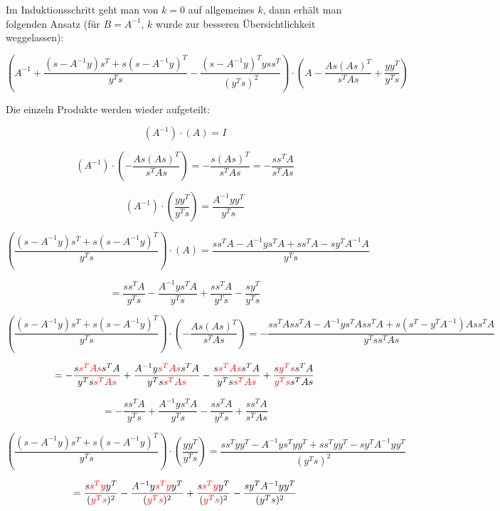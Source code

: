 \documentclass[a4paper, 12pt]{report}
\begin{document}
Im Induktionsschritt geht man von $k = 0$ auf allgemeines $k$, dann erhält man folgenden Ansatz (für $B = A^{-1}$, $k$ wurde zur besseren Übersichtlichkeit weggelassen):

$$\left(A^{-1} + \frac{(s - A^{-1}y)s^T + s(s - A^{-1}y)^T}{y^Ts} - \frac{(s - A^{-1}y)^Tyss^T}{(y^Ts)^2} \right) \cdot \left(A - \frac{As(As)^T}{s^TAs} + \frac{yy^T}{y^Ts} \right) $$

Die einzeln Produkte werden wieder aufgeteilt:

$$\left(A^{-1} \right)\cdot \left(A \right) = I$$

$$\left(A^{-1} \right)\cdot \left(- \frac{As(As)^T}{s^TAs} \right) = - \frac{s(As)^T}{s^TAs} = -\frac{ss^TA}{s^TAs}$$

$$\left(A^{-1} \right)\cdot \left( \frac{yy^T}{y^Ts} \right) = \frac{A^{-1}yy^T}{y^Ts}$$

$$\left(\frac{(s - A^{-1}y)s^T + s(s - A^{-1}y)^T}{y^Ts} \right)\cdot \left(A \right) = \frac{ss^TA - A^{-1}ys^TA + ss^TA - sy^TA^{-1}A}{y^Ts} $$

$$= \frac{ss^TA}{y^Ts} - \frac{A^{-1}ys^TA}{y^Ts} + \frac{ss^TA}{y^Ts} - \frac{sy^T}{y^Ts}$$

\begin{adjustwidth}{-65pt}{0pt}
  $$\left(\frac{(s - A^{-1}y)s^T + s(s - A^{-1}y)^T}{y^Ts} \right)\cdot \left( - \frac{As(As)^T}{s^TAs} \right) = -\frac{ss^TAss^TA - A^{-1}ys^TAss^TA + s(s^T - y^TA^{-1})Ass^TA}{y^Tss^TAs} $$
\end{adjustwidth}

$$= -\frac{s\textcolor{red}{s^TAs}s^TA}{y^Ts\textcolor{red}{s^TAs}} + \frac{A^{-1}y\textcolor{red}{s^TAs}s^TA}{y^Ts\textcolor{red}{s^TAs}} - \frac{s\textcolor{red}{s^TAs}s^TA}{y^Ts\textcolor{red}{s^TAs}} + \frac{s\textcolor{red}{y^Ts}s^TA}{\textcolor{red}{y^Ts}s^TAs}$$

$$=  -\frac{ss^TA}{y^Ts}  + \frac{A^{-1}ys^TA}{y^Ts} - \frac{ss^TA}{y^Ts} + \frac{ss^TA}{s^TAs}$$

\begin{adjustwidth}{-25pt}{0pt}
  $$\left(\frac{(s - A^{-1}y)s^T + s(s - A^{-1}y)^T}{y^Ts} \right)\cdot \left( \frac{yy^T}{y^Ts} \right) = \frac{ss^Tyy^T - A^{-1}ys^Tyy^T + ss^Tyy^T - sy^TA^{-1}yy^T}{(y^Ts)^2}$$
\end{adjustwidth}

$$= \frac{s\textcolor{red}{s^Ty}y^T}{(\textcolor{red}{y^Ts})^2} - \frac{A^{-1}y\textcolor{red}{s^Ty}y^T}{(\textcolor{red}{y^Ts})^2} + \frac{s\textcolor{red}{s^Ty}y^T}{(\textcolor{red}{y^Ts})^2} - \frac{sy^TA^{-1}yy^T}{(y^Ts)^2}$$
\end{document}

